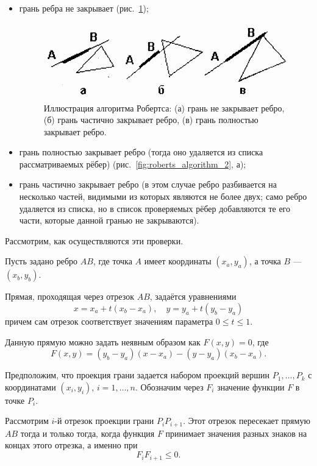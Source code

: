 \begin{itemize}
    \item грань ребра не закрывает (рис.~\ref{fig:roberts_algorithm_1});

\begin{figure}[H]
    \centering
    \includegraphics[width=\textwidth]{img/roberts_algorithm_1.png}
    \caption{Иллюстрация алгоритма Робертса: (а) грань не закрывает ребро, (б) грань частично закрывает ребро, (в) грань полностью закрывает ребро.}
    \label{fig:roberts_algorithm_1}
\end{figure}

	\item грань полностью закрывает ребро (тогда оно удаляется из списка рассматриваемых рёбер) (рис.~\ref{fig:roberts_algorithm_2}, а);
    \item грань частично закрывает ребро (в этом случае ребро разбивается на несколько частей, видимыми из которых являются не более двух; само ребро удаляется из списка, но в список проверяемых рёбер добавляются те его части, которые данной гранью не закрываются).
\end{itemize}

Рассмотрим, как осуществляются эти проверки.

Пусть задано ребро \( AB \), где точка \( A \) имеет координаты \( (x_a, y_a) \), а точка \( B \) --- \( (x_b, y_b) \).

Прямая, проходящая через отрезок \( AB \), задаётся уравнениями
\[
x = x_a + t (x_b - x_a), \quad y = y_a + t (y_b - y_a)
\]
причем сам отрезок соответствует значениям параметра \( 0 \leq t \leq 1 \).

Данную прямую можно задать неявным образом как \( F(x, y) = 0 \), где
\[
F(x, y) = (y_b - y_a)(x - x_a) - (y - y_a)(x_b - x_a).
\]

Предположим, что проекция грани задается набором проекций вершин \( P_1, \dots, P_k \) с координатами \( (x_i, y_i) \), \( i = 1, \dots, n \). Обозначим через \( F_i \) значение функции \( F \) в точке \( P_i \).

Рассмотрим \( i \)-й отрезок проекции грани \( P_i P_{i+1} \). Этот отрезок пересекает прямую \( AB \) тогда и только тогда, когда функция \( F \) принимает значения разных знаков на концах этого отрезка, а именно при
\[
F_i F_{i+1} \leq 0.
\]


